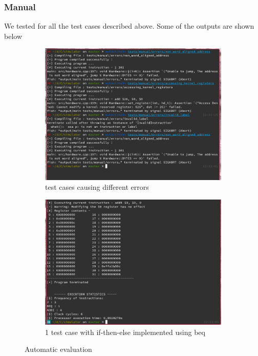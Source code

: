 \documentclass[hidelinks,12pt]{article}
\begin{document}
\subsubsection{Manual}
We tested for all the test cases described above. 
Some of the outputs are shown below
\begin{figure}[H]
    \centering
    \begin{subfigure}[t]{\textwidth}
        \centering
        \includegraphics[scale=0.4]{manual_errors.png}
        \caption{test cases causing different errors}
    \end{subfigure}
    \begin{subfigure}[t]{\textwidth}
        \centering
        \includegraphics[scale=0.4]{manual_conditional.png}
        \caption{1 test case with if-then-else implemented using beq}
    \end{subfigure}
    \caption{Automatic evaluation}
\end{figure}
\end{document}
